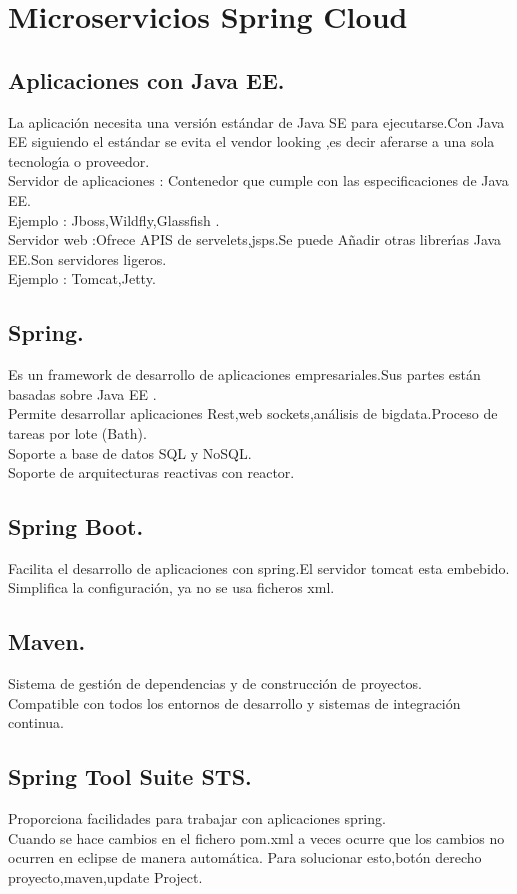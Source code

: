 \chapter{Microservicios Spring Cloud}
\section{Aplicaciones con Java EE.}
La aplicaci\'on necesita una versi\'on est\'andar de Java SE para ejecutarse.Con Java EE siguiendo
el est\'andar se evita el vendor looking ,es decir aferarse a una sola tecnolog\'\i{}a o proveedor.\\
Servidor de aplicaciones : Contenedor que cumple con las especificaciones de Java EE.\\
Ejemplo : Jboss,Wildfly,Glassfish .\\
Servidor web :Ofrece APIS de servelets,jsps.Se puede A\~nadir otras librer\'\i{}as Java EE.Son servidores ligeros.\\
Ejemplo : Tomcat,Jetty.
\section{Spring.}
Es un framework de desarrollo de aplicaciones empresariales.Sus partes est\'an basadas sobre Java EE .\\
Permite desarrollar aplicaciones Rest,web sockets,an\'alisis de bigdata.Proceso de tareas por lote (Bath).\\
Soporte a base de datos SQL y NoSQL.\\
Soporte de arquitecturas reactivas con reactor.
\section{Spring Boot.}
Facilita el desarrollo de aplicaciones con spring.El servidor tomcat esta embebido.\\
Simplifica la configuraci\'on, ya no se usa ficheros xml.
\section{Maven.}
Sistema de gesti\'on de dependencias y de construcci\'on de proyectos.\\
Compatible con todos los entornos de desarrollo y sistemas de integraci\'on continua.
\section{Spring Tool Suite STS.}
Proporciona facilidades para trabajar con aplicaciones spring.\\
Cuando se hace cambios en el fichero pom.xml a veces ocurre que los cambios no ocurren en eclipse de manera autom\'atica.
Para solucionar esto,bot\'on derecho proyecto,maven,update Project.

